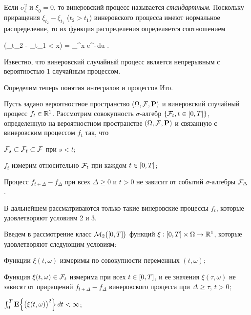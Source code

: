 Если $\sigma_\xi^2$ и $\xi_0 = 0$, то винеровский процесс называется \emph{стандартным}. Поскольку приращения $\xi_{t_2} - \xi_{t_1}$ ($t_2 > t_1$) винеровского процесса имеют нормальное распределение, то их функция распределения определяется соотношением

\beqn
	\prob(\xi_{t_2} - \xi_{t_1} < x) =  \int\limits_\infty^x e^{-}\,du \mbox{.}
\eeqn

Известно, что винеровский случайный процесс является непрерывным с вероятностью 1 случайным процессом.

\br

Определим теперь понятия интегралов и процессов Ито.

Пусть задано вероятностное пространство $(\Omega, \mathcal{F}, \mathbf{P})$ и винеровский случайный процесс $f_t \in \mathbb{R}^{1}$. Рассмотрим совокупность $\sigma$-алгебр $\{ \mathcal{F}_t, t \in [0, T] \}$, определенную на вероятностном пространстве $(\Omega, \mathcal{F}, \mathbf{P})$ и связанную с винеровским процессом $f_t$ так, что

\benum
	\item
		$\mathcal{F}_s \subset \mathcal{F}_t \subset \mathcal{F}$ при $s<t$;
	
	\item
		$f_t$ измерим относительно $\mathcal{F}_t$ при каждом $t \in [0, T]$;
		
	\item
		Процесс $f_{t+\Delta} - f_\Delta$ при всех $\Delta \geqslant 0$ и $t > 0$ не зависит от событий $\sigma$-алгебры $\mathcal{F}_\Delta$.
\eenum

В дальнейшем рассматриваются только такие винеровские процессы $f_t$, которые удовлетворяют условиям 2 и 3.

Введем в рассмотрение класс $\mathcal{M}_2\bigl( [0, T] \bigr)$ функций $\xi: [0, T] \times \Omega \to \mathbb{R}^{1}$, которые удовлетворяют следующим условиям:

\benum
	\item
		Функции $\xi(t, \omega)$ измеримы по совокупности переменных $(t, \omega)$;
	
	\item
		Функция $\xi(t, \omega) \in \mathcal{F}_t$ измерима при всех $t \in [0, T]$, и ее значения $\xi(\tau, \omega)$ не зависят от приращений $f_{t+\Delta} - f_\Delta$ винеровского процесса при $\Delta \geqslant \tau$, $t > 0$;
	
	\item
		$\int_0^T \mathbf{E} \Bigl\{ \bigl( \xi(t, \omega) \bigr)^2 \Bigr\}\,dt < \infty$;
	
